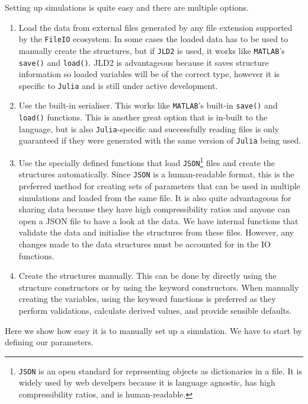 Setting up simulations is quite easy and there are multiple options.
\begin{enumerate}
    \item Load the data from external files generated by any file extension supported by the \texttt{FileIO} ecosystem. In some cases the loaded data has to be used to manually create the structures, but if \texttt{JLD2} is used, it works like \texttt{MATLAB}'s \texttt{save()} and \texttt{load()}. JLD2 is advantageous because it saves structure information so loaded variables will be of the correct type, however it is specific to \texttt{Julia} and is still under active development.
    \item Use the built-in serialiser. This works like \texttt{MATLAB}'s built-in \texttt{save()} and \texttt{load()} functions. This is another great option that is in-built to the language, but is also \texttt{Julia}-specific and successfully reading files is only guaranteed if they were generated with the same version of \texttt{Julia} being used.
    \item Use the specially defined functions that load \texttt{JSON}\footnote{\texttt{JSON} is an open standard for representing objects as dictionaries in a file. It is widely used by web develpers because it is language agnostic, has high compressibility ratios, and is human-readable.} files and create the structures automatically. Since \texttt{JSON} is a human-readable format, this is the preferred method for creating sets of parameters that can be used in multiple simulations and loaded from the same file. It is also quite advantageous for sharing data because they have high compressibility ratios and anyone can open a JSON file to have a look at the data. We have internal functions that validate the data and initialise the structures from these files. However, any changes made to the data structures must be accounted for in the IO functions.
    \item Create the structures manually. This can be done by directly using the structure constructors or by using the keyword constructors. When manually creating the variables, using the keyword functions is preferred as they perform validations, calculate derived values, and provide sensible defaults.
\end{enumerate}

Here we show how easy it is to manually set up a simulation. We have to start by defining our parameters.

